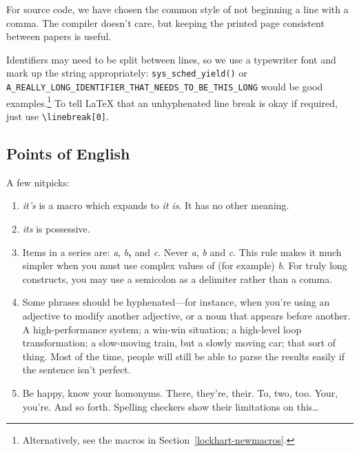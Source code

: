 \documentclass[final]{ols}
\begin{document}
For source code, we have chosen the common style of not beginning a
line with a comma.  The compiler doesn't care, but keeping the printed
page consistent between papers is useful.

Identifiers may need to be split between lines, so we use a typewriter font
and mark up the string appropriately:
\texttt{sys\_\linebreak[0]sched\_\linebreak[0]yield()} or
\texttt{\small A\_\linebreak[0]REALLY\_\linebreak[0]LONG\_\linebreak[0]IDENTIFIER\_\linebreak[0]THAT\_\linebreak[0]NEEDS\_\linebreak[0]TO\_\linebreak[0]BE\_\linebreak[0]THIS\_\linebreak[0]LONG}
would be good examples.\footnote{Alternatively, see the macros in
Section~\ref{lockhart-newmacros}.}  To tell {\LaTeX} that an unhyphenated line
break is okay if required, just use \texttt{{\textbackslash}linebreak[0]}.

\subsection{Points of English}

A few nitpicks:
\begin{enumerate}
\item \textit{it's} is a macro which expands to \textit{it is}.  It
      has no other meaning. 
\item \textit{its} is possessive.
\item Items in a series are:  \textit{a}, \textit{b}\textbf{,} and \textit{c}.  
      Never \textit{a}, \textit{b} and \textit{c}.  This rule makes it
      much simpler when you must use complex values of (for example)
      \textit{b}.  For truly long constructs, you may use a semicolon
      as a delimiter rather than a comma.
\item Some phrases should be hyphenated---for instance, when you're
  using an adjective to modify another adjective, or a noun that
  appears before another.  A high-performance system; a win-win
  situation; a high-level loop transformation; a slow-moving train,
  but a slowly moving car; that sort of thing.  Most of the time,
  people will still be able to parse the results easily if the sentence isn't
  perfect. 
\item Be happy, know your homonyms.  There, they're, their.  To, two,
      too.  Your, you're.  And so forth.  Spelling checkers show their
      limitations on this\ldots
\end{enumerate}
\end{document}
